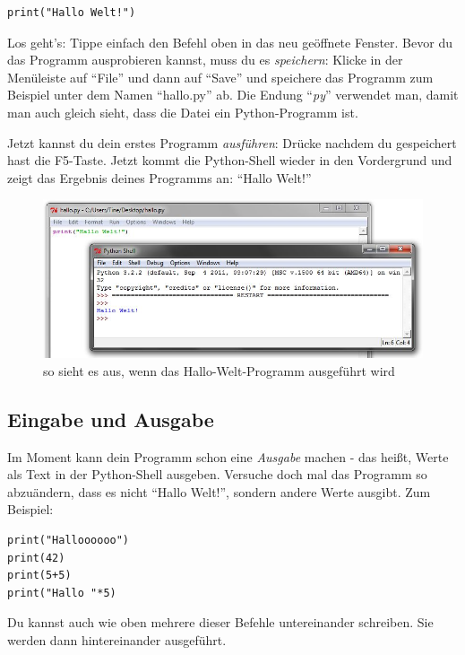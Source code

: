	\begin{lstlisting}
print("Hallo Welt!")
	\end{lstlisting}
	
	Los geht's: Tippe einfach den Befehl oben in das neu geöffnete Fenster. Bevor du das Programm ausprobieren kannst, muss du es \emph{speichern}: Klicke in der Menüleiste auf \enquote{File} und dann auf \enquote{Save} und speichere das Programm zum Beispiel unter dem Namen \enquote{hallo.py} ab. Die Endung \enquote{\emph{py}} verwendet man, damit man auch gleich sieht, dass die Datei ein Python-Programm ist. 
	
	Jetzt kannst du dein erstes Programm \emph{ausführen}: Drücke nachdem du gespeichert hast die F5-Taste. Jetzt kommt die Python-Shell wieder in den Vordergrund und zeigt das Ergebnis deines Programms an: \enquote{Hallo Welt!}
	
	\begin{figure}[htbp]
		\centering
		\includegraphics[width=1\textwidth]{img/HalloWelt.jpg}
		\caption{so sieht es aus, wenn das Hallo-Welt-Programm ausgeführt wird}
		\label{HalloWelt}
	\end{figure}
	
	\subsection*{Eingabe und Ausgabe}
	Im Moment kann dein Programm schon eine \emph{Ausgabe} machen - das heißt, Werte als Text in der Python-Shell ausgeben. Versuche doch mal das Programm so abzuändern, dass es nicht \enquote{Hallo Welt!}, sondern andere Werte ausgibt. Zum Beispiel:
	
	\begin{lstlisting}
print("Halloooooo")
print(42)
print(5+5)
print("Hallo "*5)
	\end{lstlisting}
	
	Du kannst auch wie oben mehrere dieser Befehle untereinander schreiben. Sie werden dann hintereinander ausgeführt.
	
